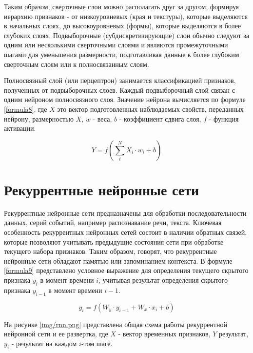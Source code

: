 Таким образом, сверточные слои можно располагать друг за другом, формируя иерархию признаков - от низкоуровневых (края и текстуры), которые выделяются в начальных слоях, до высокоуровневых (формы), которые выделяются в более глубоких слоях. Подвыборочные (субдискретизирующие) слои обычно следуют за одним или несколькими сверточными слоями и являются промежуточными шагами для уменьшения размерности, подготавливая данные к более глубоким сверточным слоям или к полносвязанным слоям.

Полносвязный слой (или перцептрон) занимается классификацией признаков, полученных от подвыборочных слоев. Каждый подвыборочный слой связан с одним нейроном полносвязного слоя. Значение нейрона вычисляется по формуле \ref{formula8}, где $X$ это вектор подготовленных наблюдаемых свойств, переданных нейрону, размерностью $X$, $w$ - веса, $b$ - коэффициент сдвига слоя, $f$ - функция активации.

\begin{equation}
Y = f(\sum_{i}^{N}X_i \cdot w_i + b)
\label{formula8}
\end{equation}

\chapter{Рекуррентные нейронные сети}
Рекуррентные нейронные сети предназначены для обработки последовательности данных, серий событий, например распознавание речи, текста. Ключевая особенность рекуррентных нейронных сетей состоит в наличии обратных связей, которые позволяют учитывать предыдущие состояния сети при обработке текущего набора признаков. Таким образом, говорят, что рекуррентные нейронные сети обладают памятью или запоминанием контекста. В формуле \ref{formula9} представлено условное выражение для определения текущего скрытого признака $y_i$ в момент времени $i$, учитывая результат определения скрытого признака $y_{i-1}$ в момент времени $i-1$.

\begin{equation}
y_i = f(W_y \cdot y_{i - 1} + W_x \cdot x_i + b)
\label{formula9}
\end{equation}

На рисунке \ref{img/rnn.png} представлена общая схема работы рекуррентной нейронной сети и ее развертка, где $X$ - вектор временных признаков, $Y$ результат, $y_i$ - результат на каждом $i$-том шаге.


